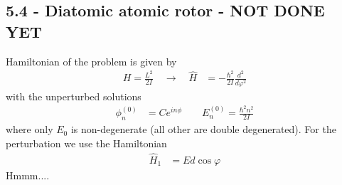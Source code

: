 \documentclass[10pt,a4paper]{book}
\theoremstyle{definition}
\begin{document}
\subsection{5.4 - Diatomic atomic rotor - NOT DONE YET}
Hamiltonian of the problem is given by
\begin{align}
H=\frac{L^2}{2I}\quad\rightarrow\quad\hat{H}&=-\frac{\hbar^2}{2I}\frac{d^2}{d\varphi^2}
\end{align}
with the unperturbed solutions
\begin{align}
\phi_n^{(0)}&=C e^{in\phi}\qquad E_n^{(0)}=\frac{\hbar^2n^2}{2I}
\end{align}
where only $E_0$  is non-degenerate (all other are double degenerated). 
For the perturbation we use the Hamiltonian
\begin{align}
\hat{H}_1&=Ed\cos\varphi
\end{align}
Hmmm....
\end{document}
